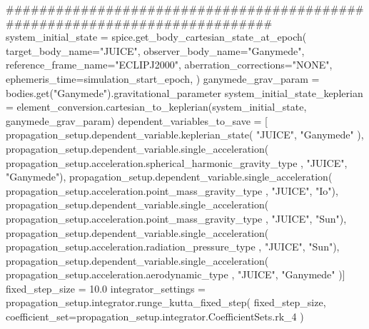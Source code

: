 {}###########################################################################\markdownRendererInterblockSeparator
{}
\markdownRendererSectionEnd \markdownRendererSectionBegin
{}\markdownRendererInterblockSeparator
{}system_initial_state = spice.get_body_cartesian_state_at_epoch( target_body_name="JUICE", observer_body_name="Ganymede", reference_frame_name="ECLIPJ2000", aberration_corrections="NONE", ephemeris_time=simulation_start_epoch, )\markdownRendererInterblockSeparator
{}
\markdownRendererSectionEnd \markdownRendererSectionBegin
{}\markdownRendererInterblockSeparator
{}ganymede_grav_param = bodies.get("Ganymede").gravitational_parameter\markdownRendererInterblockSeparator
{}
\markdownRendererSectionEnd \markdownRendererSectionBegin
{}\markdownRendererInterblockSeparator
{}
\markdownRendererSectionEnd \markdownRendererSectionBegin
{}\markdownRendererInterblockSeparator
{}system_initial_state_keplerian = element_conversion.cartesian_to_keplerian(system_initial_state, ganymede_grav_param)\markdownRendererInterblockSeparator
{}
\markdownRendererSectionEnd \markdownRendererSectionBegin
{}\markdownRendererInterblockSeparator
{}
\markdownRendererSectionEnd \markdownRendererSectionBegin
{}\markdownRendererInterblockSeparator
{}dependent_variables_to_save = [ propagation_setup.dependent_variable.keplerian_state( "JUICE", "Ganymede" ), propagation_setup.dependent_variable.single_acceleration( propagation_setup.acceleration.spherical_harmonic_gravity_type , "JUICE", "Ganymede"), propagation_setup.dependent_variable.single_acceleration( propagation_setup.acceleration.point_mass_gravity_type , "JUICE", "Io"), propagation_setup.dependent_variable.single_acceleration( propagation_setup.acceleration.point_mass_gravity_type , "JUICE", "Sun"), propagation_setup.dependent_variable.single_acceleration( propagation_setup.acceleration.radiation_pressure_type , "JUICE", "Sun"), propagation_setup.dependent_variable.single_acceleration( propagation_setup.acceleration.aerodynamic_type , "JUICE", "Ganymede" )]\markdownRendererInterblockSeparator
{}
\markdownRendererSectionEnd \markdownRendererSectionBegin
{}\markdownRendererInterblockSeparator
{}fixed_step_size = 10.0 integrator_settings = propagation_setup.integrator.runge_kutta_fixed_step( fixed_step_size, coefficient_set=propagation_setup.integrator.CoefficientSets.rk_4 )\markdownRendererInterblockSeparator
